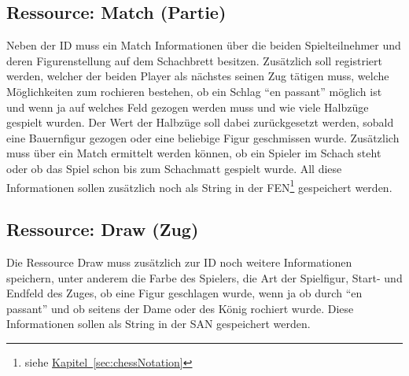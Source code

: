 \subsection{Ressource: Match (Partie)}\label{sec:resmatch}
Neben der ID muss ein Match Informationen über die beiden Spielteilnehmer und deren Figurenstellung auf dem Schachbrett besitzen. Zusätzlich soll registriert werden, welcher der beiden Player als nächstes seinen Zug tätigen muss, welche Möglichkeiten zum rochieren bestehen, ob ein Schlag \enquote{en passant} möglich ist und wenn ja auf welches Feld gezogen werden muss und wie viele Halbzüge gespielt wurden. Der Wert der Halbzüge soll dabei zurückgesetzt werden, sobald eine Bauernfigur gezogen oder eine beliebige Figur geschmissen wurde. Zusätzlich muss über ein Match ermittelt werden können, ob ein Spieler im Schach steht oder ob das Spiel schon bis zum Schachmatt gespielt wurde. All diese Informationen sollen zusätzlich noch als String in der \gls{FEN}\footnote{\label{foot:chapter}siehe \hyperref[sec:chessNotation]{Kapitel~\ref{sec:chessNotation}}} gespeichert werden.

\subsection{Ressource: Draw (Zug)}\label{sec:resdraw}
Die Ressource Draw muss zusätzlich zur ID noch weitere Informationen speichern, unter anderem die Farbe des Spielers, die Art der Spielfigur, Start- und Endfeld des Zuges, ob eine Figur geschlagen wurde, wenn ja ob durch \enquote{en passant} und ob seitens der Dame oder des König rochiert wurde. Diese Informationen sollen als String in der \gls{SAN} gespeichert werden.

